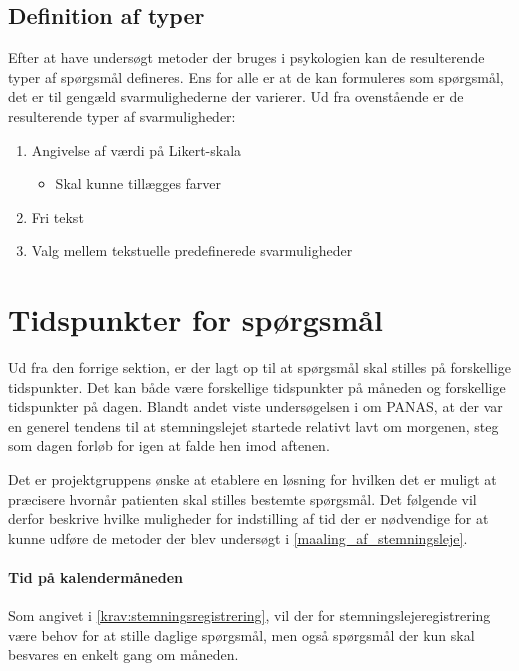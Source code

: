 \subsection{Definition af typer}\label{krav::typer}
Efter at have undersøgt metoder der bruges i psykologien kan de resulterende typer af spørgsmål defineres.
Ens for alle er at de kan formuleres som spørgsmål, det er til gengæld svarmulighederne der varierer.
Ud fra ovenstående er de resulterende typer af svarmuligheder:

\begin{enumerate}
\item Angivelse af værdi på Likert-skala
\begin{itemize}
\item Skal kunne tillægges farver
\end{itemize}
\item Fri tekst
\item Valg mellem tekstuelle predefinerede svarmuligheder
\end{enumerate}

\section{Tidspunkter for spørgsmål}\label{tidspnkforspg}
Ud fra den forrige sektion, er der lagt op til at spørgsmål skal stilles på forskellige tidspunkter.
Det kan både være forskellige tidspunkter på måneden og forskellige tidspunkter på dagen.
Blandt andet viste undersøgelsen i \citet{panas} om PANAS, at der var en generel tendens til at stemningslejet startede relativt lavt om morgenen, steg som dagen forløb for igen at falde hen imod aftenen.

Det er projektgruppens ønske at etablere en løsning for hvilken det er muligt at præcisere hvornår patienten skal stilles bestemte spørgsmål.
Det følgende vil derfor beskrive hvilke muligheder for indstilling af tid der er nødvendige for at kunne udføre de metoder der blev undersøgt i \cref{maaling_af_stemningsleje}.

\paragraph{Tid på kalendermåneden}
Som angivet i \cref{krav:stemningsregistrering}, vil der for stemningslejeregistrering være behov for at stille daglige spørgsmål, men også spørgsmål der kun skal besvares en enkelt gang om måneden.

